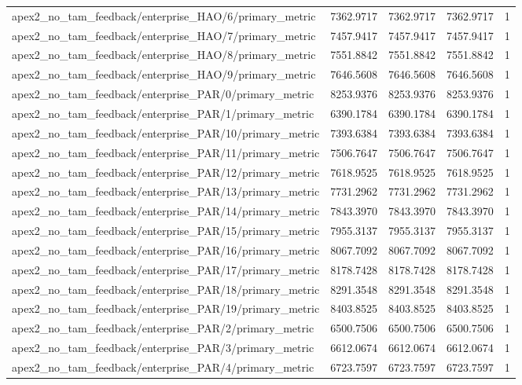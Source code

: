 \begin{table}[h]
\begin{tabular}{lrrrr}
apex2_no_tam_feedback/enterprise_HAO/6/primary_metric & 7362.9717 & 7362.9717 & 7362.9717 & 1 \\
apex2_no_tam_feedback/enterprise_HAO/7/primary_metric & 7457.9417 & 7457.9417 & 7457.9417 & 1 \\
apex2_no_tam_feedback/enterprise_HAO/8/primary_metric & 7551.8842 & 7551.8842 & 7551.8842 & 1 \\
apex2_no_tam_feedback/enterprise_HAO/9/primary_metric & 7646.5608 & 7646.5608 & 7646.5608 & 1 \\
apex2_no_tam_feedback/enterprise_PAR/0/primary_metric & 8253.9376 & 8253.9376 & 8253.9376 & 1 \\
apex2_no_tam_feedback/enterprise_PAR/1/primary_metric & 6390.1784 & 6390.1784 & 6390.1784 & 1 \\
apex2_no_tam_feedback/enterprise_PAR/10/primary_metric & 7393.6384 & 7393.6384 & 7393.6384 & 1 \\
apex2_no_tam_feedback/enterprise_PAR/11/primary_metric & 7506.7647 & 7506.7647 & 7506.7647 & 1 \\
apex2_no_tam_feedback/enterprise_PAR/12/primary_metric & 7618.9525 & 7618.9525 & 7618.9525 & 1 \\
apex2_no_tam_feedback/enterprise_PAR/13/primary_metric & 7731.2962 & 7731.2962 & 7731.2962 & 1 \\
apex2_no_tam_feedback/enterprise_PAR/14/primary_metric & 7843.3970 & 7843.3970 & 7843.3970 & 1 \\
apex2_no_tam_feedback/enterprise_PAR/15/primary_metric & 7955.3137 & 7955.3137 & 7955.3137 & 1 \\
apex2_no_tam_feedback/enterprise_PAR/16/primary_metric & 8067.7092 & 8067.7092 & 8067.7092 & 1 \\
apex2_no_tam_feedback/enterprise_PAR/17/primary_metric & 8178.7428 & 8178.7428 & 8178.7428 & 1 \\
apex2_no_tam_feedback/enterprise_PAR/18/primary_metric & 8291.3548 & 8291.3548 & 8291.3548 & 1 \\
apex2_no_tam_feedback/enterprise_PAR/19/primary_metric & 8403.8525 & 8403.8525 & 8403.8525 & 1 \\
apex2_no_tam_feedback/enterprise_PAR/2/primary_metric & 6500.7506 & 6500.7506 & 6500.7506 & 1 \\
apex2_no_tam_feedback/enterprise_PAR/3/primary_metric & 6612.0674 & 6612.0674 & 6612.0674 & 1 \\
apex2_no_tam_feedback/enterprise_PAR/4/primary_metric & 6723.7597 & 6723.7597 & 6723.7597 & 1 \\

\end{tabular}
\end{table}
